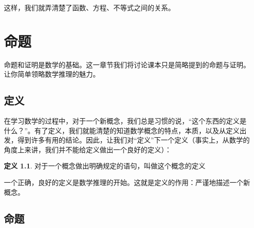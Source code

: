 \documentclass[a4paper,12pt]{ctexbook}
\theoremstyle{definition}
\newtheorem{definition}{定义}[chapter]
\theoremstyle{plain}
\theoremstyle{remark}
\begin{document}
这样，我们就弄清楚了函数、方程、不等式之间的关系。


\chapter{命题}

命题和证明是数学的基础。这一章节我们将讨论课本只是简略提到的命题与证明。让你简单领略数学推理的魅力。

\section{定义}

在学习数学的过程中，对于一个新概念，我们总是习惯的说，“这个东西的定义是什么？”。有了定义，我们就能清楚的知道数学概念的特点，本质，以及从定义出发，得到许多有用的结论。因此，让我们对“定义”下一个定义（事实上，从数学的角度上来讲，我们并不能给定义做出一个良好的定义）：

\begin{definition}
对于一个概念做出明确规定的语句，叫做这个概念的定义
\end{definition}

一个正确，良好的定义是数学推理的开始。这就是定义的作用：严谨地描述一个新概念。

\section{命题}
\end{document}
